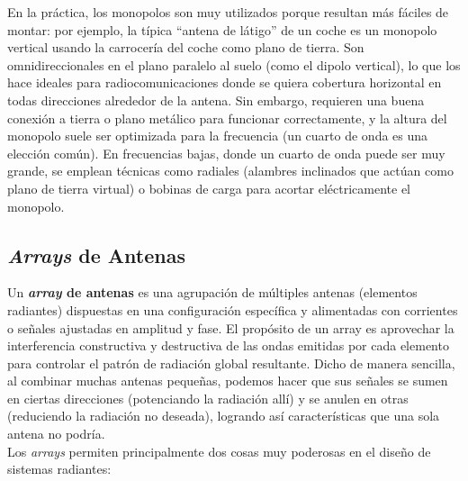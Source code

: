 En la práctica, los monopolos son muy utilizados porque resultan más fáciles de montar: por ejemplo, la típica “antena de látigo” de un coche es un monopolo vertical usando la carrocería del coche como plano de tierra. Son omnidireccionales en el plano paralelo al suelo (como el dipolo vertical), lo que los hace ideales para radiocomunicaciones donde se quiera cobertura horizontal en todas direcciones alrededor de la antena. Sin embargo, requieren una buena conexión a tierra o plano metálico para funcionar correctamente, y la altura del monopolo suele ser optimizada para la frecuencia (un cuarto de onda es una elección común). En frecuencias bajas, donde un cuarto de onda puede ser muy grande, se emplean técnicas como radiales (alambres inclinados que actúan como plano de tierra virtual) o bobinas de carga para acortar eléctricamente el monopolo.\\

\subsection{\textit{Arrays} de Antenas}

Un \textbf{\textit{array} de antenas} es una agrupación de múltiples antenas (elementos radiantes) dispuestas en una configuración específica y alimentadas con corrientes o señales ajustadas en amplitud y fase. El propósito de un array es aprovechar la interferencia constructiva y destructiva de las ondas emitidas por cada elemento para controlar el patrón de radiación global resultante. Dicho de manera sencilla, al combinar muchas antenas pequeñas, podemos hacer que sus señales se sumen en ciertas direcciones (potenciando la radiación allí) y se anulen en otras (reduciendo la radiación no deseada), logrando así características que una sola antena no podría.\\

Los \textit{arrays} permiten principalmente dos cosas muy poderosas en el diseño de sistemas radiantes:\\

